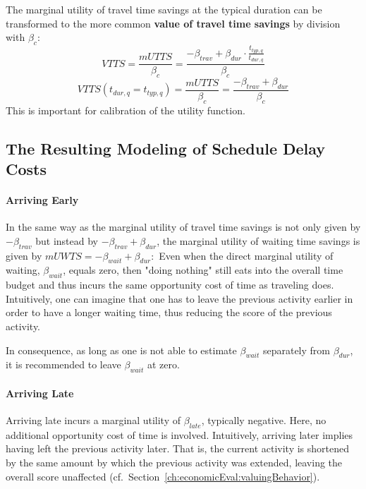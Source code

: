 The marginal utility of travel time savings at the typical duration can be transformed to the more common \textbf{value of travel time savings} by division with $\beta_{c}$:
\[
VTTS = \frac{mUTTS}{\beta_{c}} = \frac{- \beta_{trav} + \beta_{dur} \cdot \frac{t_{typ,q}}{t_{dur,q}} }{\beta_{c}}
\]
\[
VTTS(t_{dur,q} = t_{typ,q}) = \frac{mUTTS}{\beta_{c}} = \frac{- \beta_{trav} + \beta_{dur}}{\beta_{c}}
\]
This is important for calibration of the utility function.


\subsection{The Resulting Modeling of Schedule Delay Costs}
\label{sec:schedule-delay-costs}

\paragraph{Arriving Early}

In the same way as the marginal utility of travel time savings is not only given by $- \beta_{trav}$ but instead by $- \beta_{trav} + \beta_{dur}$, the marginal utility of waiting time savings is given by 
$
mUWTS = - \beta_{wait} + \beta_{dur}: 
$
Even when the direct marginal utility of waiting, $\beta_{wait}$, equals zero, then "doing nothing" still eats into the overall time budget and thus incurs the same opportunity cost of time as traveling does.  
%
Intuitively, one can imagine that one has to leave the previous activity earlier in order to have a longer waiting time, thus reducing the score of the previous activity.

In consequence, as long as one is not able to estimate $\beta_{wait}$ separately from $\beta_{dur}$, it is recommended to leave $\beta_{wait}$ at zero.

\paragraph{Arriving Late}

Arriving late incurs a marginal utility of $\beta_{late}$, typically negative.  Here, no additional opportunity cost of time is involved. Intuitively, arriving later implies having left the previous activity later.  That is, the current activity is shortened by the same amount by which the previous activity was extended, leaving the overall score unaffected (cf.\ Section~\ref{ch:economicEval:valuingBehavior}). 


